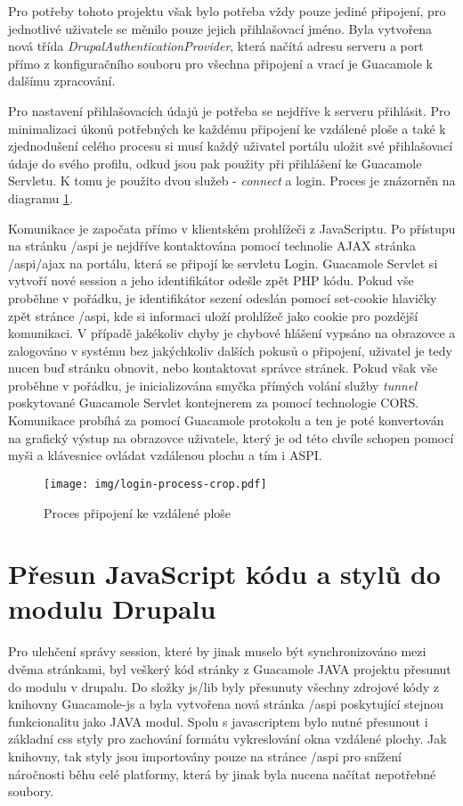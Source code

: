 Pro potřeby tohoto projektu však bylo potřeba vždy pouze jediné připojení, pro jednotlivé uživatele se měnilo pouze jejich přihlašovací jméno. Byla vytvořena nová třída \emph{DrupalAuthenticationProvider}, která načítá adresu serveru a port přímo z konfiguračního souboru pro všechna připojení a vrací je Guacamole k dalšímu zpracování. 

Pro nastavení přihlašovacích údajů je potřeba se nejdříve k serveru přihlásit. Pro minimalizaci úkonů potřebných ke každému připojení ke vzdálené ploše a také k zjednodušení celého procesu si musí každý uživatel portálu uložit své přihlašovací údaje do svého profilu, odkud jsou pak použity při přihlášení ke Guacamole Servletu. K tomu je použito dvou služeb - \emph{connect} a {login}. Proces je znázorněn na diagramu \ref{fig:login_process}. 

Komunikace je započata přímo v klientském prohlížeči z JavaScriptu. Po přístupu na stránku /aspi je nejdříve kontaktována pomocí technolie AJAX stránka /aspi/ajax na portálu, která se připojí ke servletu Login. Guacamole Servlet si vytvoří nové \gls{session} a jeho identifikátor odešle zpět PHP kódu. Pokud vše proběhne v pořádku, je identifikátor sezení odeslán pomocí set-cookie hlavičky zpět stránce /aspi, kde si informaci uloží prohlížeč jako cookie pro pozdější komunikaci. V případě jakékoliv chyby je chybové hlášení vypsáno na obrazovce a zalogováno v systému bez jakýchkoliv dalších pokusů o připojení, uživatel je tedy nucen buď stránku obnovit, nebo kontaktovat správce stránek. Pokud však vše proběhne v pořádku, je inicializována smyčka přímých volání služby \emph{tunnel} poskytované Guacamole Servlet kontejnerem za pomocí technologie CORS. Komunikace probíhá za pomocí Guacamole protokolu a ten je poté konvertován na grafický výstup na obrazovce uživatele, který je od této chvíle schopen pomocí myši a klávesnice ovládat vzdálenou plochu a tím i ASPI.

\begin{figure}[]
  \texttt{[image: img/login-process-crop.pdf]}
  \caption{Proces připojení ke vzdálené ploše}
  \label{fig:login_process}
\end{figure}  

\section{Přesun JavaScript kódu a stylů do modulu Drupalu}
Pro ulehčení správy \gls{session}, které by jinak muselo být synchronizováno mezi dvěma stránkami, byl veškerý kód stránky z Guacamole JAVA projektu přesunut do modulu v drupalu. Do složky js/lib byly přesunuty všechny zdrojové kódy z knihovny Guacamole-js a byla vytvořena nová stránka /aspi poskytující stejnou funkcionalitu jako JAVA modul. Spolu s javascriptem bylo nutné přesunout i základní css styly pro zachování formátu vykreslování okna vzdálené plochy. Jak knihovny, tak styly jsou importovány pouze na stránce /aspi pro snížení náročnosti běhu celé platformy, která by jinak byla nucena načítat nepotřebné soubory. 

